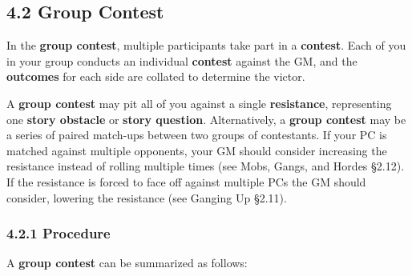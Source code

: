 \documentclass[
  11pt,
]{article}
\begin{document}
\hypertarget{group-contest}{%
\subsection{4.2 Group Contest}\label{group-contest}}

In the \textbf{group contest}, multiple participants take part in a
\textbf{contest}. Each of you in your group conducts an individual
\textbf{contest} against the GM, and the \textbf{outcomes} for each side
are collated to determine the victor.

A \textbf{group contest} may pit all of you against a single
\textbf{resistance}, representing one \textbf{story obstacle} or
\textbf{story question}. Alternatively, a \textbf{group contest} may be
a series of paired match-ups between two groups of contestants. If your
PC is matched against multiple opponents, your GM should consider
increasing the resistance instead of rolling multiple times (see Mobs,
Gangs, and Hordes §2.12). If the resistance is forced to face off
against multiple PCs the GM should consider, lowering the resistance
(see Ganging Up §2.11).

\hypertarget{procedure-1}{%
\subsubsection{4.2.1 Procedure}\label{procedure-1}}

A \textbf{group contest} can be summarized as follows:
\end{document}
